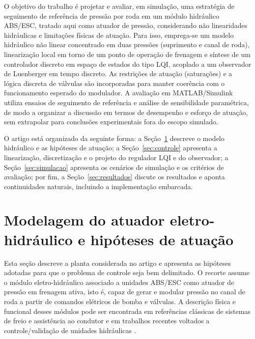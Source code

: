 \documentclass[a4paper]{ifacconf}
\begin{document}
O objetivo do trabalho é projetar e avaliar, em simulação, uma estratégia de seguimento de referência de pressão por roda em um módulo hidráulico ABS/ESC, tratado aqui como atuador de pressão, considerando não linearidades hidráulicas e limitações físicas de atuação. Para isso, emprega-se um modelo hidráulico não linear concentrado em duas pressões (suprimento e canal de roda), linearização local em torno de um ponto de operação de frenagem e síntese de um controlador discreto em espaço de estados do tipo LQI, acoplado a um observador de Luenberger em tempo discreto. As restrições de atuação (saturações) e a lógica discreta de válvulas são incorporadas para manter coerência com o funcionamento esperado do modulador. A avaliação em MATLAB/Simulink utiliza ensaios de seguimento de referência e análise de sensibilidade paramétrica, de modo a organizar a discussão em termos de desempenho e esforço de atuação, sem extrapolar para conclusões experimentais fora do escopo simulado.

O artigo está organizado da seguinte forma: a Seção~\ref{sec:modelagem} descreve o modelo hidráulico e as hipóteses de atuação; a Seção~\ref{sec:controle} apresenta a linearização, discretização e o projeto do regulador LQI e do observador; a Seção~\ref{sec:simulacao} apresenta os cenários de simulação e os critérios de avaliação; por fim, a Seção~\ref{sec:resultados} discute os resultados e aponta continuidades naturais, incluindo a implementação embarcada.

\section{Modelagem do atuador eletro-hidráulico e hipóteses de atuação}
\label{sec:modelagem}
Esta seção descreve a planta considerada no artigo e apresenta as hipóteses adotadas para que o problema de controle seja bem delimitado. O recorte assume o módulo eletro-hidráulico associado a unidades ABS/ESC como atuador de pressão em frenagem ativa, isto é, capaz de gerar e modular pressão no canal de roda a partir de comandos elétricos de bomba e válvulas. A descrição física e funcional desses módulos pode ser encontrada em referências clássicas de sistemas de freio e assistência ao condutor \cite{Konrad2014,Rudolf2011} e em trabalhos recentes voltados a controle/validação de unidades hidráulicas \cite{HouhuaJing2022,ZengYangHuang2023}.
\end{document}
